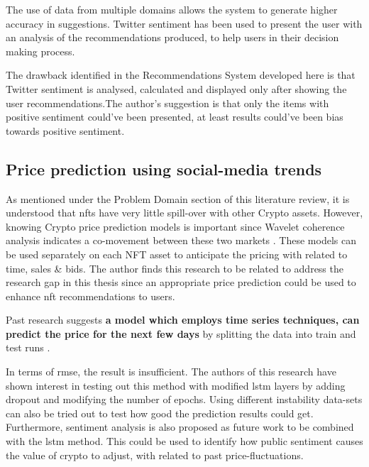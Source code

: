 The use of data from multiple domains allows the system to generate higher accuracy in suggestions. Twitter sentiment has been used to present the user with an analysis of the recommendations produced, to help users in their decision making process.

The drawback identified in the Recommendations System developed here is that Twitter sentiment is analysed, calculated and displayed only after showing the user recommendations.The author's suggestion is that only the items with positive sentiment could've been presented, at least results could've been bias towards positive sentiment.


\subsection{Price prediction using social-media trends}



As mentioned under the Problem Domain section of this literature review, it is understood that \gls{nft}s have very little spill-over with other Crypto assets. However, knowing Crypto price prediction models is important since Wavelet coherence analysis indicates a co-movement between these two markets \autocite{dowling_is_2021}.
These models can be used separately on each NFT asset to anticipate the pricing with related to time, sales \& bids.
The author finds this research to be related to address the research gap in this thesis since an appropriate price prediction could be used to enhance \Gls{nft}  recommendations to users.

Past research suggests \textbf{a model which employs time series techniques, can predict the price for the next few days} by splitting the data into train and test runs \autocite{ferdiansyah_lstm-method_2019}.

In terms of \gls{rmse}, the result is insufficient. The authors of this research have shown interest in testing out this method with modified \gls{lstm} layers by adding dropout and modifying the number of epochs. Using different instability data-sets can also be tried out to test how good the prediction results could get. 
Furthermore, sentiment analysis is also proposed as future work to be combined with the \gls{lstm} method. This could be used to identify how public sentiment causes the value of crypto to adjust, with related to past price-fluctuations.


